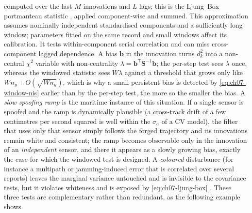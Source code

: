 computed over the last $M$ innovations and $L$ lags; this is the Ljung--Box portmanteau statistic \cite{ljung_box_1978}, applied component-wise and summed. This approximation assumes nominally independent standardised components and a sufficiently long window; parameters fitted on the same record and small windows affect its calibration. It tests within-component serial correlation and can miss cross-component lagged dependence. A bias $\mathbf{b}$ in the innovation turns $d_k^{2}$ into a non-central $\chi^{2}$ variable with non-centrality $\lambda=\mathbf{b}^{\mathsf T}\mathbf{S}^{-1}\mathbf{b}$; the per-step test sees $\lambda$ once, whereas the windowed statistic sees $W\lambda$ against a threshold that grows only like $W n_y+O(\sqrt{W n_y})$, which is why a small persistent bias is detected by \eqref{eq:ch07-window-nis} earlier than by the per-step test, the more so the smaller the bias. A \emph{slow spoofing ramp} is the maritime instance of this situation. If a single sensor is spoofed and the ramp is dynamically plausible (a cross-track drift of a few centimetres per second squared is well within the $\sigma_a$ of a CV model), the filter that uses only that sensor simply follows the forged trajectory and its innovations remain white and consistent; the ramp becomes observable only in the innovation of an \emph{independent} sensor, and there it appears as a slowly growing bias, exactly the case for which the windowed test is designed. A \emph{coloured} disturbance (for instance a multipath or jamming-induced error that is correlated over several reports) leaves the marginal variance untouched and is invisible to the covariance tests, but it violates whiteness and is exposed by \eqref{eq:ch07-ljung-box} \cite{oliva_innovation_2026}. These three tests are complementary rather than redundant, as the following example shows.

